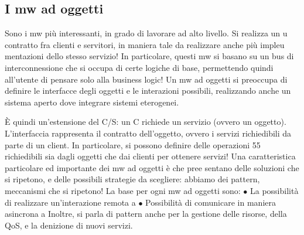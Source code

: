 \subsection{I mw ad oggetti}
Sono i mw più interessanti, in grado di lavorare ad alto livello. Si realizza un
u
contratto fra clienti e servitori, in maniera tale da realizzare anche più impleu
mentazioni dello stesso servizio! In particolare, questi mw si basano su un bus
di interconnessione che si occupa di certe logiche di base, permettendo quindi
all'utente di pensare solo alla business logic! Un mw ad oggetti si preoccupa di
definire le interfacce degli oggetti e le interazioni possibili, realizzando anche un
sistema aperto dove integrare sistemi eterogenei.

È quindi un'estensione del C/S: un C richiede un servizio (ovvero un oggetto). L'interfaccia rappresenta il contratto
dell'oggetto, ovvero i servizi richiedibili da parte di un client. In particolare, si possono definire delle operazioni
55
richiedibili sia dagli oggetti che dai clienti per ottenere servizi!
Una caratteristica particolare ed importante dei mw ad oggetti è che pree
sentano delle soluzioni che si ripetono, e delle possibili strategie da scegliere:
abbiamo dei pattern, meccanismi che si ripetono!
La base per ogni mw ad oggetti sono:
$\bullet$ La possibilità di realizzare un'interazione remota
a
$\bullet$ Possibilità di comunicare in maniera asincrona
a
Inoltre, si parla di pattern anche per la gestione delle risorse, della QoS, e la
denizione di nuovi servizi.

